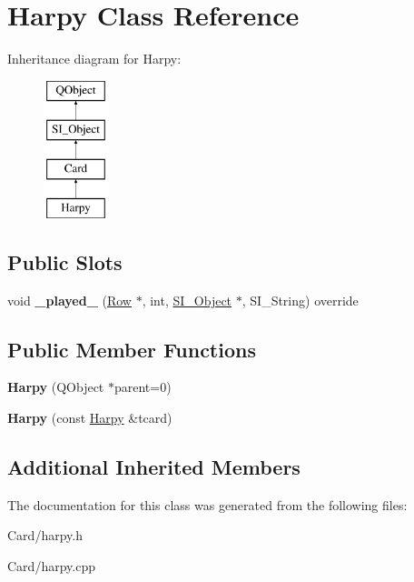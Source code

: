 \hypertarget{class_harpy}{}\section{Harpy Class Reference}
\label{class_harpy}
Inheritance diagram for Harpy\+:\begin{figure}[H]
\begin{center}
\leavevmode
\includegraphics[height=4.000000cm]{class_harpy}
\end{center}
\end{figure}
\subsection*{Public Slots}
\begin{DoxyCompactItemize}
\item 
\mbox{\label{class_harpy_a43862d3b6e6d7f1affbe840b3b58f0a0}} 
void {\bfseries \+\_\+played\+\_\+} (\hyperlink{class_card_set}{Row} $\ast$, int, \hyperlink{class_s_i___object}{S\+I\+\_\+\+Object} $\ast$, S\+I\+\_\+\+String) override
\end{DoxyCompactItemize}
\subsection*{Public Member Functions}
\begin{DoxyCompactItemize}
\item 
\mbox{\label{class_harpy_a06c4380b7dcc4875b93ad7c1527c8e8b}} 
{\bfseries Harpy} (Q\+Object $\ast$parent=0)
\item 
\mbox{\label{class_harpy_a7c6cb8db68e92147ebb4b7e4f1a2a16e}} 
{\bfseries Harpy} (const \hyperlink{class_harpy}{Harpy} \&tcard)
\end{DoxyCompactItemize}
\subsection*{Additional Inherited Members}


The documentation for this class was generated from the following files\+:\begin{DoxyCompactItemize}
\item 
Card/harpy.\+h\item 
Card/harpy.\+cpp\end{DoxyCompactItemize}
